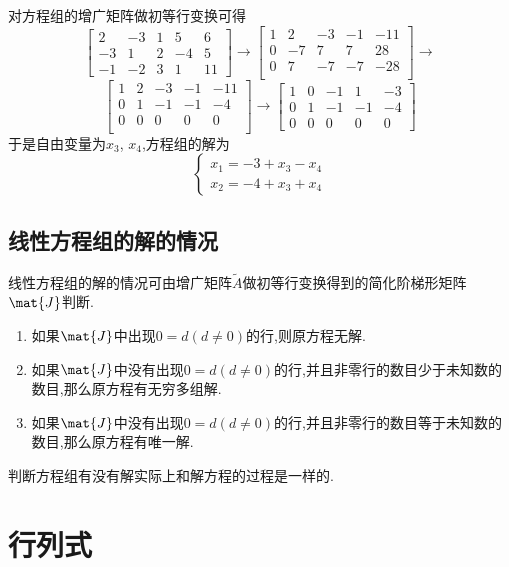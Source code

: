 \documentclass{ctexart}
\begin{document}
\begin{solution}
    对方程组的增广矩阵做初等行变换可得
    \[\begin{bmatrix}
        2&-3&1&5&6\\
        -3&1&2&-4&5\\
        -1&-2&3&1&11
    \end{bmatrix}\longrightarrow\begin{bmatrix}
        1&2&-3&-1&-11\\
        0&-7&7&7&28\\
        0&7&-7&-7&-28\\
    \end{bmatrix}\longrightarrow\]
    \[\begin{bmatrix}
        1&2&-3&-1&-11\\
        0&1&-1&-1&-4\\
        0&0&0&0&0\\
    \end{bmatrix}\longrightarrow\begin{bmatrix}
        1&0&-1&1&-3\\
        0&1&-1&-1&-4\\
        0&0&0&0&0
    \end{bmatrix}\]
    于是自由变量为$x_3$, $x_4$,方程组的解为
    \[\left\{\begin{array}{l}
        x_1=-3+x_3-x_4\\
        x_2=-4+x_3+x_4
    \end{array}\right.\]
\end{solution}
\subsection{线性方程组的解的情况}
\begin{theorem}[线性方程组的解的情况]
    线性方程组的解的情况可由增广矩阵$\tilde{A}$做初等行变换得到的简化阶梯形矩阵$\mat{J}$判断.
    \begin{enumerate}
        \item 如果$\mat{J}$中出现$0=d(d\neq0)$的行,则原方程无解.
        \item 如果$\mat{J}$中没有出现$0=d(d\neq0)$的行,并且非零行的数目少于未知数的数目,那么原方程有无穷多组解.
        \item 如果$\mat{J}$中没有出现$0=d(d\neq0)$的行,并且非零行的数目等于未知数的数目,那么原方程有唯一解.
    \end{enumerate}
\end{theorem}
判断方程组有没有解实际上和解方程的过程是一样的.
\section{行列式}
\end{document}

